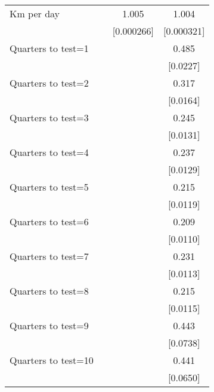 \begin{longtable}{lccc}
Km per day          &                     &       1.005\sym{***}&       1.004\sym{***}\tabularnewline
                    &                     &  [0.000266]         &  [0.000321]         \tabularnewline
  
Quarters to test=1  &                     &                     &       0.485\sym{***}\tabularnewline
                    &                     &                     &    [0.0227]         \tabularnewline
  
Quarters to test=2  &                     &                     &       0.317\sym{***}\tabularnewline
                    &                     &                     &    [0.0164]         \tabularnewline
  
Quarters to test=3  &                     &                     &       0.245\sym{***}\tabularnewline
                    &                     &                     &    [0.0131]         \tabularnewline
  
Quarters to test=4  &                     &                     &       0.237\sym{***}\tabularnewline
                    &                     &                     &    [0.0129]         \tabularnewline
  
Quarters to test=5  &                     &                     &       0.215\sym{***}\tabularnewline
                    &                     &                     &    [0.0119]         \tabularnewline
  
Quarters to test=6  &                     &                     &       0.209\sym{***}\tabularnewline
                    &                     &                     &    [0.0110]         \tabularnewline
  
Quarters to test=7  &                     &                     &       0.231\sym{***}\tabularnewline
                    &                     &                     &    [0.0113]         \tabularnewline
  
Quarters to test=8  &                     &                     &       0.215\sym{***}\tabularnewline
                    &                     &                     &    [0.0115]         \tabularnewline
  
Quarters to test=9  &                     &                     &       0.443\sym{***}\tabularnewline
                    &                     &                     &    [0.0738]         \tabularnewline
  
Quarters to test=10 &                     &                     &       0.441\sym{***}\tabularnewline
                    &                     &                     &    [0.0650]         \tabularnewline
  

\end{longtable}
